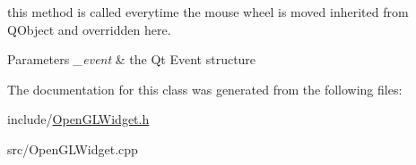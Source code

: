 this method is called everytime the mouse wheel is moved inherited from Q\-Object and overridden here. 


\begin{DoxyParams}{Parameters}
{\em \-\_\-event} & the Qt Event structure \\
\hline
\end{DoxyParams}


The documentation for this class was generated from the following files\-:\begin{DoxyCompactItemize}
\item 
include/\hyperlink{_open_g_l_widget_8h}{Open\-G\-L\-Widget.\-h}\item 
src/Open\-G\-L\-Widget.\-cpp\end{DoxyCompactItemize}
